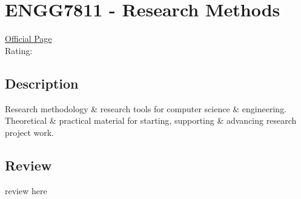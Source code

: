 \hypertarget{ENGG7811}{\section{ENGG7811 - Research Methods}}

\large
\textcolor{turbo_purple}{\href{https://my.uq.edu.au/programs-courses/course.html?course_code=ENGG7811}{Official Page}} \\
Rating: \cstar\cstar\cstar\cstar\ostar

\normalsize
\subsection*{Description}
Research methodology \& research tools for computer science \& engineering.
Theoretical \& practical material for starting, supporting \& advancing research project work.

\subsection*{Review}
review here
